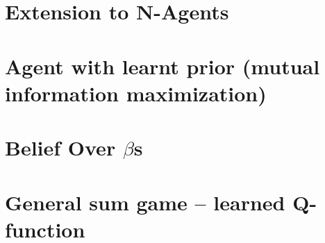 \section{Extension to N-Agents}

\section{Agent with learnt prior (mutual information maximization)}

\section{Belief Over $\beta$s}

\section{General sum game -- learned Q-function}